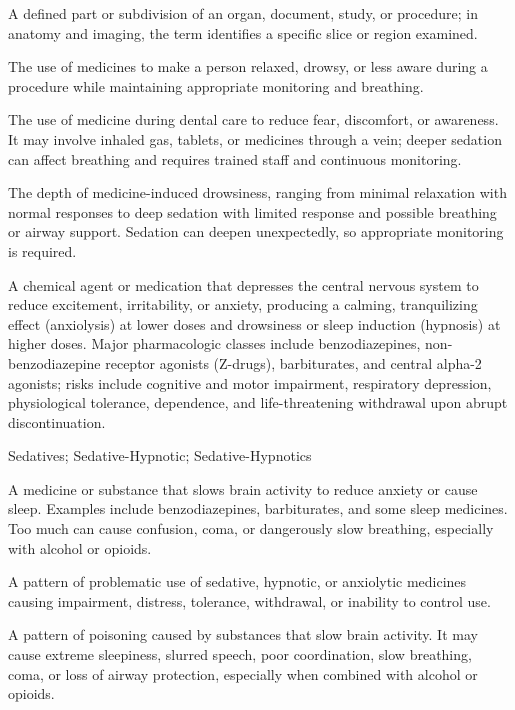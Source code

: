  A defined part or subdivision of an organ, document, study, or procedure; in anatomy and imaging, the term identifies a specific slice or region examined.

 The use of medicines to make a person relaxed, drowsy, or less aware during a procedure while maintaining appropriate monitoring and breathing.

 The use of medicine during dental care to reduce fear, discomfort, or awareness. It may involve inhaled gas, tablets, or medicines through a vein; deeper sedation can affect breathing and requires trained staff and continuous monitoring.

 The depth of medicine-induced drowsiness, ranging from minimal relaxation with normal responses to deep sedation with limited response and possible breathing or airway support. Sedation can deepen unexpectedly, so appropriate monitoring is required.

 A chemical agent or medication that depresses the central nervous system to reduce excitement, irritability, or anxiety, producing a calming, tranquilizing effect (anxiolysis) at lower doses and drowsiness or sleep induction (hypnosis) at higher doses. Major pharmacologic classes include benzodiazepines, non-benzodiazepine receptor agonists (Z-drugs), barbiturates, and central alpha-2 agonists; risks include cognitive and motor impairment, respiratory depression, physiological tolerance, dependence, and life-threatening withdrawal upon abrupt discontinuation.

\synonyms
Sedatives; Sedative-Hypnotic; Sedative-Hypnotics

 A medicine or substance that slows brain activity to reduce anxiety or cause sleep. Examples include benzodiazepines, barbiturates, and some sleep medicines. Too much can cause confusion, coma, or dangerously slow breathing, especially with alcohol or opioids.

 A pattern of problematic use of sedative, hypnotic, or anxiolytic medicines causing impairment, distress, tolerance, withdrawal, or inability to control use.

 A pattern of poisoning caused by substances that slow brain activity. It may cause extreme sleepiness, slurred speech, poor coordination, slow breathing, coma, or loss of airway protection, especially when combined with alcohol or opioids.

